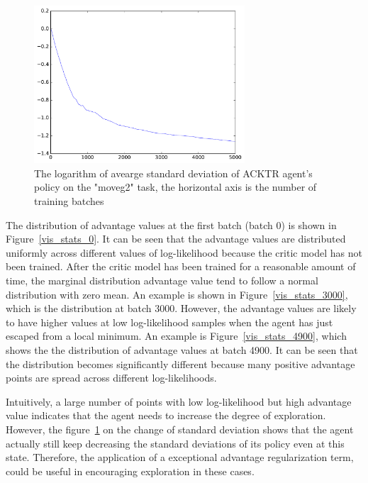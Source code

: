 \begin{figure}[!htbp]
	\includegraphics[width=0.7\textwidth]{images/rec_stat_moveg2_std.pdf}
	\centering
	\caption{The logarithm of avearge standard deviation of ACKTR agent's policy on the "moveg2" task, the horizontal axis is the number of training batches}\label{rec_stat_moveg2_std}
\end{figure}
The distribution of advantage values at the first batch (batch 0) is shown in Figure~\ref{vis_stats_0}. It can be seen that the advantage values are distributed uniformly across different values of log-likelihood because the critic model has not been trained. After the critic model has been trained for a reasonable amount of time, the marginal distribution advantage value tend to follow a normal distribution with zero mean. An example is shown in Figure~\ref{vis_stats_3000}, which is the distribution at batch 3000. However, the advantage values are likely to have higher values at low log-likelihood samples when the agent has just escaped from a local minimum. An example is Figure~\ref{vis_stats_4900}, which shows the the distribution of advantage values at batch 4900. It can be seen that the distribution becomes significantly different because many positive advantage points are spread across different log-likelihoods. 

Intuitively, a large number of points with low log-likelihood but high advantage value indicates that the agent needs to increase the degree of exploration. However, the figure~\ref{rec_stat_moveg2_std} on the change of standard deviation shows that the agent actually still keep decreasing the standard deviations of its policy even at this state. Therefore, the application of a exceptional advantage regularization term, could be useful in encouraging exploration in these cases.

